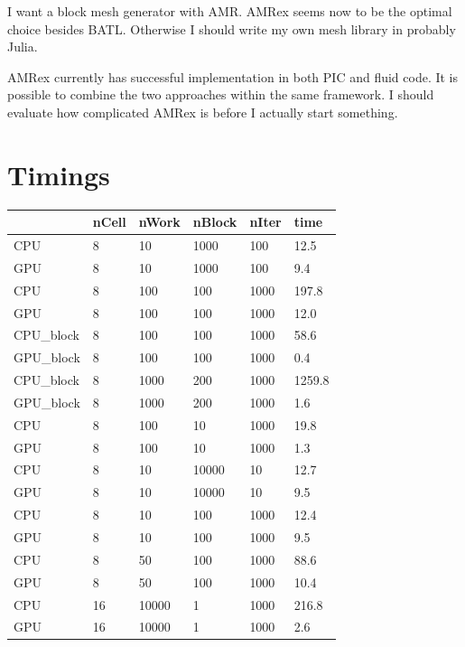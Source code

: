 \documentclass[11pt]{book} %
\begin{document}
I want a block mesh generator with AMR. AMRex seems now to be the optimal choice besides BATL. Otherwise I should write my own mesh library in probably Julia.

AMRex currently has successful implementation in both PIC and fluid code. It is possible to combine the two approaches within the same framework. I should evaluate how complicated AMRex is before I actually start something.


\section{Timings}

\begin{table}[]
\begin{tabular}{llllll}
\hline
           & nCell & nWork & nBlock & nIter & time   \\
           \hline
CPU        & 8     & 10    & 1000   & 100   & 12.5   \\
GPU        & 8     & 10    & 1000   & 100   & 9.4    \\
CPU        & 8     & 100   & 100    & 1000  & 197.8  \\
GPU        & 8     & 100   & 100    & 1000  & 12.0   \\
CPU\_block & 8     & 100   & 100    & 1000  & 58.6    \\
GPU\_block & 8     & 100   & 100    & 1000  & 0.4    \\
CPU\_block & 8     & 1000  & 200    & 1000  & 1259.8 \\
GPU\_block & 8     & 1000  & 200    & 1000  & 1.6    \\
CPU        & 8     & 100   & 10     & 1000  & 19.8   \\
GPU        & 8     & 100   & 10     & 1000  & 1.3    \\
CPU        & 8     & 10    & 10000  & 10    & 12.7   \\
GPU        & 8     & 10    & 10000  & 10    & 9.5    \\
CPU        & 8     & 10    & 100    & 1000  & 12.4   \\
GPU        & 8     & 10    & 100    & 1000  & 9.5    \\
CPU        & 8     & 50    & 100    & 1000  & 88.6   \\
GPU        & 8     & 50    & 100    & 1000  & 10.4   \\
CPU        & 16    & 10000 & 1      & 1000  & 216.8  \\
GPU        & 16    & 10000 & 1      & 1000  & 2.6    \\

\end{tabular}
\end{table}
\end{document}
